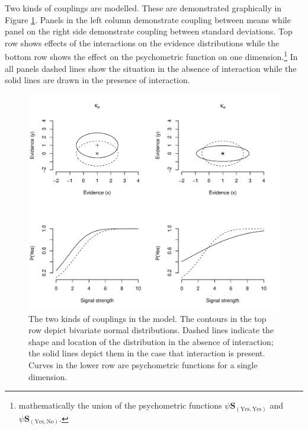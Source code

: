 \documentclass{article}\usepackage{knitr}
\begin{document}
Two kinds of couplings are modelled. These are demonstrated graphically  in Figure \ref{fig:grt_couplings}. Panels in the left column demonstrate coupling between means while panel on the right side demonstrate coupling between standard deviations. Top row shows effects of the interactions on the evidence distributions while the bottom row shows the effect on the psychometric function on one dimension.\footnote{mathematically the union of the psychometric functions $\psi{\bm{S}}_{(\text{Yes}, \text{Yes})}$ and $\psi{\bm{S}}_{(\text{Yes}, \text{No})}$.} In all panels dashed lines show the situation in the absence of interaction while the solid lines are drawn in the presence of interaction. 

\begin{figure}
\begin{center}
\begin{knitrout}
\color{fgcolor}
\includegraphics[width=\maxwidth]{figure/unnamed-chunk-11-1} 
\end{knitrout}
\end{center}
\caption{The two kinds of couplings in the model. The contours in the top row depict bivariate normal distributions. Dashed lines indicate the shape and location of the distribution in the absence of interaction; the solid lines depict them in the case that interaction is present. Curves in the lower row are psychometric functions for a single dimension.}
\label{fig:grt_couplings}
\end{figure}
\end{document}
